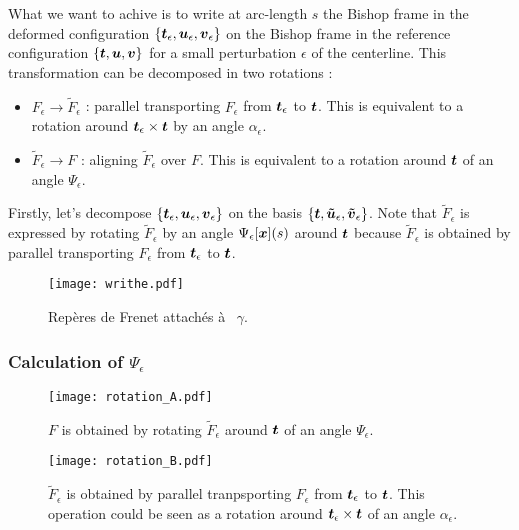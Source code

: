 What we want to achive is to write at arc-length $s$ the Bishop frame in the deformed configuration $\{\boldsymbol{t}_\epsilon, \boldsymbol{u}_\epsilon,\boldsymbol{v}_\epsilon\}$ on the Bishop frame in the reference configuration $\{\boldsymbol{t}, \boldsymbol{u},\boldsymbol{v}\}$ for a small perturbation $\epsilon$ of the centerline. This transformation can be decomposed in two rotations :

\begin{itemize}
\item
$F_\epsilon \rightarrow \tilde{F}_\epsilon$ : parallel transporting $F_\epsilon$ from $\boldsymbol{t}_\epsilon$ to $\boldsymbol{t}$.
This is equivalent to a rotation around $\boldsymbol{t}_\epsilon \times \boldsymbol{t}$ by an angle $\alpha_\epsilon$.
\item
$\tilde{F}_\epsilon \rightarrow F$ : aligning $\tilde{F}_\epsilon$ over $F$.
This is equivalent to a rotation around $\boldsymbol{t}$ of an angle $\Psi_\epsilon$.
\end{itemize}

Firstly, let's decompose $\{\boldsymbol{t}_\epsilon, \boldsymbol{u}_\epsilon,\boldsymbol{v}_\epsilon\}$ on the basis $\{\boldsymbol{t}, \boldsymbol{\tilde{u}}_\epsilon,\boldsymbol{\tilde{v}}_\epsilon\}$. Note that $\tilde{F}_\epsilon$ is expressed by rotating $\tilde{F}_\epsilon$ by an angle $\Psi_\epsilon[\boldsymbol{x}](s)$ around $\boldsymbol{t}$ because $\tilde{F}_\epsilon$ is obtained by parallel transporting $F_\epsilon$ from $\boldsymbol{t}_\epsilon$ to $\boldsymbol{t}$.

\begin{figure}[t]
\centering
\texttt{[image: writhe.pdf]}
\caption{Repères de Frenet attachés à  $\gamma$.}
\label{fig:1_1}
\end{figure}

\subsubsection{Calculation of $\Psi_\epsilon$}

\begin{figure}[p]
\centering
\texttt{[image: rotation\_A.pdf]}
\caption{$F$ is obtained by rotating $\tilde{F}_\epsilon$ around $\boldsymbol{t}$ of an angle $\Psi_\epsilon$.}
\texttt{[image: rotation\_B.pdf]}
\caption{$\tilde{F}_\epsilon$ is obtained by parallel tranpsporting $F_\epsilon$ from $\boldsymbol{t}_\epsilon$ to $\boldsymbol{t}$. This operation could be seen as a rotation around $\boldsymbol{t}_\epsilon \times \boldsymbol{t}$ of an angle $\alpha_\epsilon$.}
\label{A}
\end{figure}

